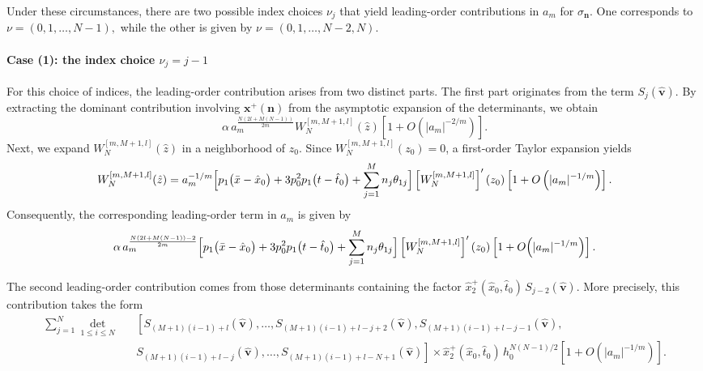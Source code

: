 \documentclass[preprint,3p,10pt]{elsarticle}
\theoremstyle{definition}
\begin{document}
Under these circumstances, there are two possible index choices $\nu_j$ that yield leading-order contributions in $a_m$ for $\sigma_{\mathbf{n}}$. One corresponds to $\nu=(0,1,\ldots,N-1),$
while the other is given by $\nu=(0,1,\ldots,N-2,N).$

\paragraph{Case (1): the index choice $\nu_j=j-1$}
For this choice of indices, the leading-order contribution arises from two distinct parts. 
The first part originates from the term $S_j(\hat{\mathbf{v}})$. 
By extracting the dominant contribution involving $\mathbf{x}^{+}(\mathbf{n})$ from the asymptotic expansion of the determinants, we obtain
\begin{equation}
  \alpha\, a_m^{\frac{N(2l+M(N-1))}{2m}}
  W_{N}^{[m,M+1,l]}(\hat{z})
  \left[1+O\!\left(|a_m|^{-2/m}\right)\right].
\end{equation}
Next, we expand $W_{N}^{[m,M+1,l]}(\hat{z})$ in a neighborhood of $z_0$. 
Since $W_{N}^{[m,M+1,l]}(z_0)=0$, a first-order Taylor expansion yields
\begin{equation}
  W_{N}^{[m,M+1,l]}(\hat{z})
  = a_m^{-1/m}
  \Bigl[
      p_1\bigl(\bar{x}-\hat{x}_0\bigr)
      + 3p_0^2p_1 \bigl(t-\hat{t}_0\bigr)
      +\sum_{j=1}^{M} n_j \theta_{1j}
  \Bigr]
  \left[W_{N}^{[m,M+1,l]}\right]'(z_0)
  \left[1+O \left(|a_m|^{-1/m}\right)\right].
\end{equation}
Consequently, the corresponding leading-order term in $a_m$ is given by
\begin{equation}\label{1 index-part 1}
  \alpha\, a_m^{\frac{N(2l+M(N-1))-2}{2m}}
  \Bigl[
      p_1\bigl(\bar{x}-\hat{x}_0\bigr)
      + 3p_0^2p_1 \bigl(t-\hat{t}_0\bigr)
      +\sum_{j=1}^{M} n_j \theta_{1j}
  \Bigr]
  \left[W_{N}^{[m,M+1,l]}\right]'(z_0)
  \left[1+O\!\left(|a_m|^{-1/m}\right)\right].
\end{equation}

The second leading-order contribution comes from those determinants containing the factor
$\hat{x}_2^{+}(\hat{x}_0,\hat{t}_0)\,S_{j-2}(\hat{\mathbf{v}})$. 
More precisely, this contribution takes the form
\begin{eqnarray}
  \sum_{j=1}^{N}
  \det_{1\le i\le N}
  &&\left[
      S_{(M+1)(i-1)+l}(\hat{\mathbf{v}}),\ldots,
      S_{(M+1)(i-1)+l-j+2}(\hat{\mathbf{v}}),
      S_{(M+1)(i-1)+l-j-1}(\hat{\mathbf{v}}),\right. \nonumber\\
     && \left.
      S_{(M+1)(i-1)+l-j}(\hat{\mathbf{v}}),\ldots,
      S_{(M+1)(i-1)+l-N+1}(\hat{\mathbf{v}})
  \right] \times
  \hat{x}_2^{+}(\hat{x}_0,\hat{t}_0)\,
  h_0^{N(N-1)/2}
  \left[1+O\!\left(|a_m|^{-1/m}\right)\right].
  \label{1 index-part 2}
\end{eqnarray}
\end{document}
